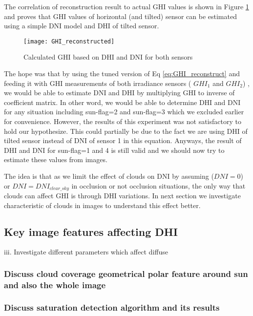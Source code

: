 The correlation of reconstruction result to actual GHI values is shown in Figure \ref{fig:GHI_reconstruct_result} and proves that GHI values of horizontal (and tilted) sensor can be estimated using a simple DNI model and DHI of tilted sensor.


\begin{figure}[h]
\caption{Calculated GHI based on DHI and DNI for both sensors}
\label{fig:GHI_reconstruct_result}
\texttt{[image: GHI\_reconstructed]}
\centering
\end{figure}

The hope was that by using the tuned version of Eq \ref{eq:GHI_reconstruct} and feeding it with GHI measurements of both irradiance sensors ( $GHI_1$ and  $GHI_2$) , we would be able to estimate DNI and DHI by multiplying GHI to inverse of coefficient matrix. In other word, we would be able to determine DHI and DNI for any situation including sun-flag=2 and sun-flag=3 which we excluded earlier for convenience. However, the results of this experiment was not satisfactory to hold our hypothesize. This could partially be due to the fact we are using DHI of tilted sensor instead of DNI of sensor 1 in this equation. Anyways,   the result of DHI and DNI for sun-flag=1 and 4 is still valid and we should now try to estimate these values from images.

The idea is that as we limit the effect of clouds on DNI by assuming ($DNI=0$) or $DNI=DNI_{clear\_sky}$ in occlusion or not occlusion situations, the only way that clouds can affect GHI is through DHI variations. In next section we investigate characteristic of clouds in images to understand this effect better.

\subsection{Key image features affecting DHI}

\label{sec:img-features}
iii.	Investigate different parameters which affect diffuse
\subsubsection{Discuss cloud coverage geometrical polar feature around sun and also the whole image}
\subsubsection{Discuss saturation detection algorithm and its results}


